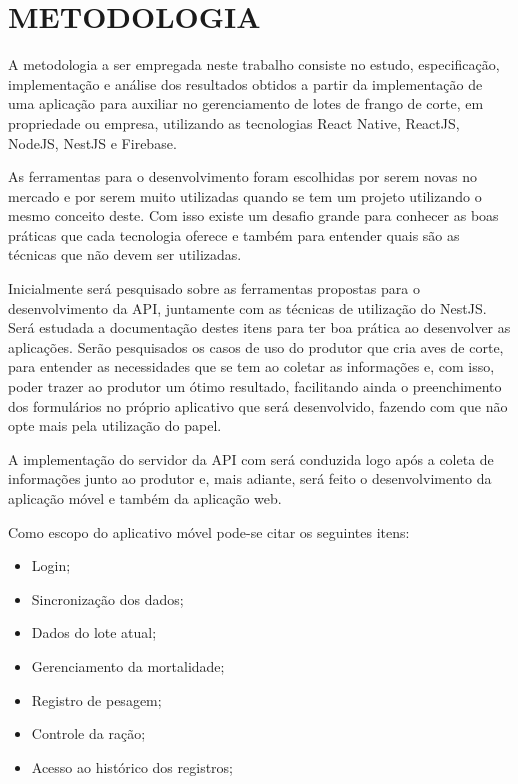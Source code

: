 
\chapter{METODOLOGIA}
\label{chap:metodologia}

A metodologia a ser empregada neste trabalho consiste no estudo, especificação, implementação e análise dos resultados obtidos a partir da implementação de uma aplicação para auxiliar no gerenciamento de lotes  de frango de corte, em propriedade ou empresa, utilizando as tecnologias React Native, ReactJS, NodeJS, NestJS e Firebase.

As ferramentas para o desenvolvimento foram escolhidas por serem novas no mercado e por serem muito utilizadas quando se tem um projeto utilizando o mesmo conceito deste. Com isso existe um desafio grande para conhecer as boas práticas que cada tecnologia oferece e também para entender quais são as técnicas que não devem ser utilizadas.

Inicialmente será pesquisado sobre as ferramentas propostas para o desenvolvimento da API, juntamente com as técnicas de utilização do NestJS. Será estudada a documentação destes itens para ter boa prática ao desenvolver as aplicações. Serão pesquisados os casos de uso do produtor que cria aves de corte, para entender as necessidades que se tem ao coletar as informações e, com isso, poder trazer ao produtor um ótimo resultado, facilitando ainda o preenchimento dos formulários no próprio aplicativo que será desenvolvido, fazendo com que não opte mais pela utilização do papel. 

A implementação do servidor da API com será conduzida logo após a coleta de informações junto ao produtor e, mais adiante, será feito o desenvolvimento da aplicação móvel e também da aplicação web.

Como escopo do aplicativo móvel pode-se citar os seguintes itens:

\begin{itemize}
    \item Login;
    \item Sincronização dos dados;
    \item Dados do lote atual;
    \item Gerenciamento da mortalidade;
    \item Registro de pesagem;
    \item Controle da ração;
    \item Acesso ao histórico dos registros;
\end{itemize}
